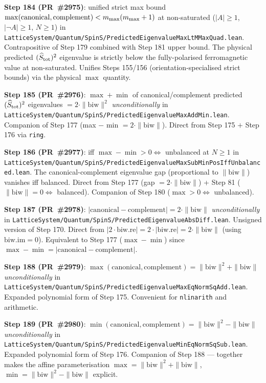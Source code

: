 \documentclass[a4paper,11pt]{article}
\begin{document}
\textbf{Step 184 (PR~\#2975)}: unified strict max bound
$\max(\mathrm{canonical}, \mathrm{complement}) < m_{\rm max}(m_{\rm max}+1)$
at non-saturated ($|A| \ge 1$, $|\neg A| \ge 1$, $N \ge 1$) in
\texttt{LatticeSystem/Quantum/SpinS/PredictedEigenvalueMaxLtMMaxQuad.lean}.
Contrapositive of Step 179 combined with Step 181 upper bound. The
physical predicted $(\widehat S_{\rm tot})^2$ eigenvalue is strictly
below the fully-polarised ferromagnetic value at non-saturated. Unifies
Steps 155/156 (orientation-specialised strict bounds) via the physical
$\max$ quantity.

\textbf{Step 185 (PR~\#2976)}: $\max + \min$ of canonical/complement
predicted $(\widehat S_{\rm tot})^2$ eigenvalues $= 2\cdot\|\mathrm{biw}\|^2$
\emph{unconditionally} in
\texttt{LatticeSystem/Quantum/SpinS/PredictedEigenvalueMaxAddMin.lean}.
Companion of Step 177 (max $-$ min $= 2\cdot\|\mathrm{biw}\|$). Direct
from Step 175 $+$ Step 176 via \texttt{ring}.

\textbf{Step 186 (PR~\#2977)}: iff $\max - \min > 0 \Leftrightarrow$
unbalanced at $N \ge 1$ in
\texttt{LatticeSystem/Quantum/SpinS/PredictedEigenvalueMaxSubMinPosIffUnbalanced.lean}.
The canonical-complement eigenvalue gap (proportional to $\|\mathrm{biw}\|$)
vanishes iff balanced. Direct from Step 177 (gap $= 2\cdot\|\mathrm{biw}\|$)
+ Step 81 ($\|\mathrm{biw}\| = 0 \Leftrightarrow$ balanced). Companion
of Step 180 ($\max > 0 \Leftrightarrow$ unbalanced).

\textbf{Step 187 (PR~\#2978)}: $|\mathrm{canonical} - \mathrm{complement}|
= 2\cdot\|\mathrm{biw}\|$ \emph{unconditionally} in
\texttt{LatticeSystem/Quantum/SpinS/PredictedEigenvalueAbsDiff.lean}.
Unsigned version of Step 170. Direct from
$|2\cdot\mathrm{biw.re}| = 2\cdot|\mathrm{biw.re}| = 2\cdot\|\mathrm{biw}\|$
(using $\mathrm{biw.im} = 0$). Equivalent to Step 177 ($\max - \min$)
since $\max - \min = |\mathrm{canonical} - \mathrm{complement}|$.

\textbf{Step 188 (PR~\#2979)}: $\max(\mathrm{canonical}, \mathrm{complement})
= \|\mathrm{biw}\|^2 + \|\mathrm{biw}\|$ \emph{unconditionally} in
\texttt{LatticeSystem/Quantum/SpinS/PredictedEigenvalueMaxEqNormSqAdd.lean}.
Expanded polynomial form of Step 175. Convenient for \texttt{nlinarith}
and arithmetic.

\textbf{Step 189 (PR~\#2980)}: $\min(\mathrm{canonical}, \mathrm{complement})
= \|\mathrm{biw}\|^2 - \|\mathrm{biw}\|$ \emph{unconditionally} in
\texttt{LatticeSystem/Quantum/SpinS/PredictedEigenvalueMinEqNormSqSub.lean}.
Expanded polynomial form of Step 176. Companion of Step 188 — together
makes the affine parameterisation
$\max = \|\mathrm{biw}\|^2 + \|\mathrm{biw}\|$,
$\min = \|\mathrm{biw}\|^2 - \|\mathrm{biw}\|$ explicit.
\end{document}
